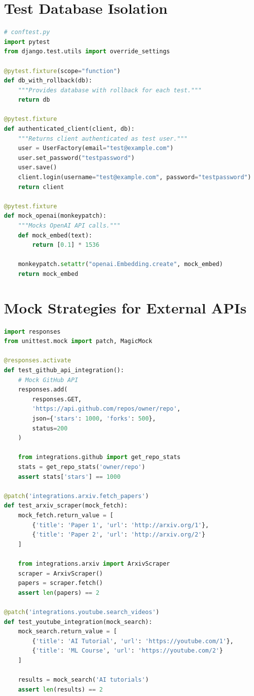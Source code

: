 \documentclass{report}
\begin{document}
\section{Test Database Isolation}

\begin{lstlisting}[language=Python, caption=pytest-django database isolation configuration]
# conftest.py
import pytest
from django.test.utils import override_settings

@pytest.fixture(scope="function")
def db_with_rollback(db):
    """Provides database with rollback for each test."""
    return db

@pytest.fixture
def authenticated_client(client, db):
    """Returns client authenticated as test user."""
    user = UserFactory(email="test@example.com")
    user.set_password("testpassword")
    user.save()
    client.login(username="test@example.com", password="testpassword")
    return client

@pytest.fixture
def mock_openai(monkeypatch):
    """Mocks OpenAI API calls."""
    def mock_embed(text):
        return [0.1] * 1536
    
    monkeypatch.setattr("openai.Embedding.create", mock_embed)
    return mock_embed
\end{lstlisting}

\section{Mock Strategies for External APIs}

\begin{lstlisting}[language=Python, caption=External API mocking strategies]
import responses
from unittest.mock import patch, MagicMock

@responses.activate
def test_github_api_integration():
    # Mock GitHub API
    responses.add(
        responses.GET,
        'https://api.github.com/repos/owner/repo',
        json={'stars': 1000, 'forks': 500},
        status=200
    )
    
    from integrations.github import get_repo_stats
    stats = get_repo_stats('owner/repo')
    assert stats['stars'] == 1000

@patch('integrations.arxiv.fetch_papers')
def test_arxiv_scraper(mock_fetch):
    mock_fetch.return_value = [
        {'title': 'Paper 1', 'url': 'http://arxiv.org/1'},
        {'title': 'Paper 2', 'url': 'http://arxiv.org/2'}
    ]
    
    from integrations.arxiv import ArxivScraper
    scraper = ArxivScraper()
    papers = scraper.fetch()
    assert len(papers) == 2

@patch('integrations.youtube.search_videos')
def test_youtube_integration(mock_search):
    mock_search.return_value = [
        {'title': 'AI Tutorial', 'url': 'https://youtube.com/1'},
        {'title': 'ML Course', 'url': 'https://youtube.com/2'}
    ]
    
    results = mock_search('AI tutorials')
    assert len(results) == 2
\end{lstlisting}
\end{document}
